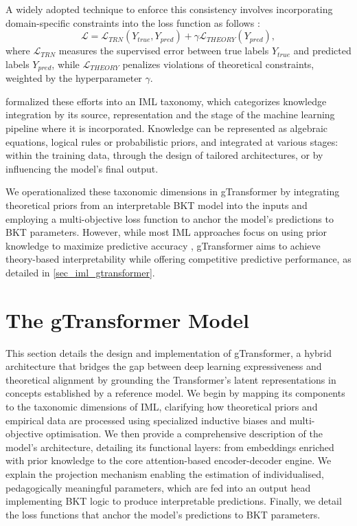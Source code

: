\documentclass[applsci,article,submit,moreauthors,pdftex]{Definitions/mdpi}
\begin{document}
A widely adopted technique to enforce this consistency involves incorporating domain-specific constraints into the loss function as follows \citep{karpatne2017theory, willard2022integrating}: 
\begin{equation} \label{eq_theory_loss}
\mathcal{L} = \mathcal{L}_{TRN}(Y_{true}, Y_{pred}) + \gamma \mathcal{L}_{THEORY}(Y_{pred}),
\end{equation}
where $\mathcal{L}_{TRN}$ measures the supervised error between true labels $Y_{true}$ and predicted labels $Y_{pred}$, while $\mathcal{L}_{THEORY}$ penalizes violations of theoretical constraints, weighted by the hyperparameter $\gamma$. 

\citet{vonrueden2021informed} formalized these efforts into an IML taxonomy, which categorizes knowledge integration by its source, representation and the stage of the machine learning pipeline where it is incorporated. Knowledge can be represented as algebraic equations, logical rules or probabilistic priors, and integrated at various stages: within the training data, through the design of tailored architectures, or by influencing the model's final output. 

We operationalized these taxonomic dimensions in gTransformer by integrating theoretical priors from an interpretable BKT model into the inputs and employing a multi-objective loss function to anchor the model's predictions to BKT parameters. However, while most IML approaches focus on using prior knowledge to maximize predictive accuracy \citep{vonrueden2021informed}, gTransformer aims to achieve theory-based interpretability while offering competitive predictive performance, as detailed in \cref{sec_iml_gtransformer}. 


\section{The gTransformer Model} \label{sec_arch}

This section details the design and implementation of gTransformer, a hybrid architecture that bridges the gap between deep learning expressiveness and theoretical alignment by grounding the Transformer's latent representations in concepts established by a reference model. We begin by mapping its components to the taxonomic dimensions of IML, clarifying how theoretical priors and empirical data are processed using specialized inductive biases and multi-objective optimisation. We then provide a comprehensive description of the model's architecture, detailing its functional layers: from embeddings enriched with prior knowledge to the core attention-based encoder-decoder engine. We explain the projection mechanism enabling the estimation of individualised, pedagogically meaningful parameters, which are fed into an output head implementing BKT logic to produce interpretable predictions. Finally, we detail the loss functions that anchor the model's predictions to BKT parameters.
\end{document}

